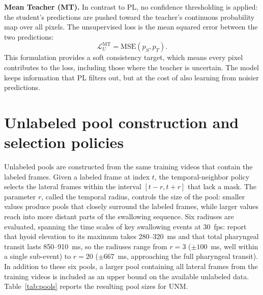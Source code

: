 \documentclass[
  msc,
  american
]{ThesisPUC_v2}
\begin{document}
\textbf{Mean Teacher (MT).} In contrast to PL, no confidence thresholding is applied: the student's predictions are pushed toward the teacher's continuous probability map over all pixels. The unsupervised loss is the mean squared error between the two predictions:
\begin{equation}
\mathcal{L}_U^{\text{MT}} = \text{MSE}(p_S, p_T).
\end{equation}
This formulation provides a soft consistency target, which means every pixel contributes to the loss, including those where the teacher is uncertain. The model keeps information that PL filters out, but at the cost of also learning from noisier predictions.

\section{Unlabeled pool construction and selection policies}
\label{sec:method-pool}

Unlabeled pools are constructed from the same training videos that contain the labeled frames. Given a labeled frame at index $t$, the temporal-neighbor policy selects the lateral frames within the interval $[t-r, t+r]$ that lack a mask. The parameter $r$, called the temporal radius, controls the size of the pool: smaller values produce pools that closely surround the labeled frames, while larger values reach into more distant parts of the swallowing sequence. Six radiuses are evaluated, spanning the time scales of key swallowing events at 30~fps: \citet{ref_kendall2000} report that hyoid elevation to its maximum takes 280--320~ms and that total pharyngeal transit lasts 850--910~ms, so the radiuses range from $r=3$ ($\pm 100$~ms, well within a single sub-event) to $r=20$ ($\pm 667$~ms, approaching the full pharyngeal transit). In addition to these six pools, a larger pool containing all lateral frames from the training videos is included as an upper bound on the available unlabeled data. Table~\ref{tab:pools} reports the resulting pool sizes for UNM.
\end{document}
